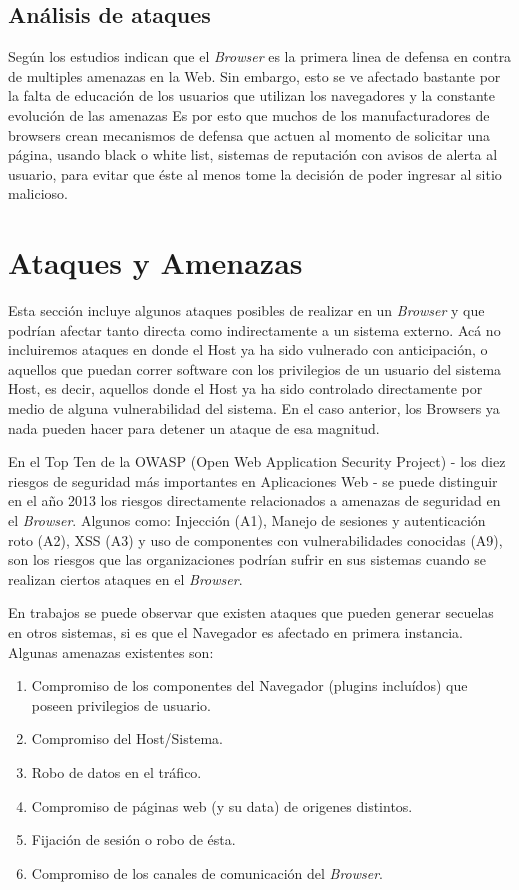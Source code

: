 	\subsection{Análisis de ataques}
	Según los estudios \cite{browSecPhish, Labs2013, rowSecSEMBlock} indican que el \textit{Browser} es la primera linea de defensa en contra de multiples amenazas en la Web. Sin embargo, esto se ve afectado bastante por la falta de educación de los usuarios que utilizan los navegadores y la constante evolución de las amenazas \cite{browSecPhish} Es por esto que muchos de los manufacturadores de browsers crean mecanismos de defensa \cite{Drake2011} que actuen al momento de solicitar una página, usando black o white list, sistemas de reputación \cite{Rajab2013} con avisos de alerta al usuario, para evitar que éste al menos tome la decisión de poder ingresar al sitio malicioso.

\section{Ataques y Amenazas}
Esta sección incluye algunos ataques posibles de realizar en un \textit{Browser} y que podrían afectar tanto directa como indirectamente a un sistema externo. Acá no incluiremos ataques en donde el Host ya ha sido vulnerado con anticipación, o aquellos que puedan correr software con los privilegios de un usuario del sistema Host, es decir, aquellos donde el Host ya ha sido controlado directamente por medio de alguna vulnerabilidad del sistema. En el caso anterior, los Browsers ya nada pueden hacer para detener un ataque de esa magnitud.

En el Top Ten \cite{owaspTopTen} de la OWASP (Open Web Application Security Project) - los diez riesgos de seguridad más importantes en Aplicaciones Web - se puede distinguir en el año 2013 los riesgos directamente relacionados a amenazas de seguridad en el \textit{Browser}. Algunos como: Injección (A1), Manejo de sesiones y autenticación roto (A2), XSS (A3) y uso de componentes con vulnerabilidades conocidas (A9), son los riesgos que las organizaciones podrían sufrir en sus sistemas cuando se realizan ciertos ataques en el \textit{Browser}.

En trabajos \cite{barth2008security, FirefoxThreatModel} se puede observar que existen ataques que pueden generar secuelas en otros sistemas, si es que el Navegador es afectado en primera instancia. Algunas amenazas existentes son:

\begin{enumerate}
	\item Compromiso de los componentes del Navegador (plugins incluídos) que poseen privilegios de usuario.
	\item Compromiso del Host/Sistema.
	\item Robo de datos en el tráfico.
	\item Compromiso de páginas web (y su data) de origenes distintos.
	\item Fijación de sesión o robo de ésta.
	\item Compromiso de los canales de comunicación del \textit{Browser}.
\end{enumerate}

